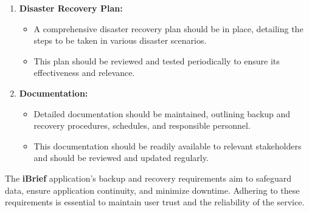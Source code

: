 \begin{enumerate}
    \item \textbf{Disaster Recovery Plan:}
    \begin{itemize}
        \item A comprehensive disaster \gls{recovery} plan should be in place, detailing the steps to be taken in various disaster scenarios.
        \item This plan should be reviewed and tested periodically to ensure its effectiveness and relevance.
    \end{itemize}
    
    \item \textbf{Documentation:}
    \begin{itemize}
        \item Detailed documentation should be maintained, outlining \gls{backup} and \gls{recovery} procedures, schedules, and responsible personnel.
        \item This documentation should be readily available to relevant stakeholders and should be reviewed and updated regularly.
    \end{itemize}
\end{enumerate}

The \textbf{iBrief} application's \gls{backup} and \gls{recovery} requirements aim to safeguard data, ensure application continuity, and minimize downtime. Adhering to these requirements is essential to maintain user trust and the reliability of the service.
